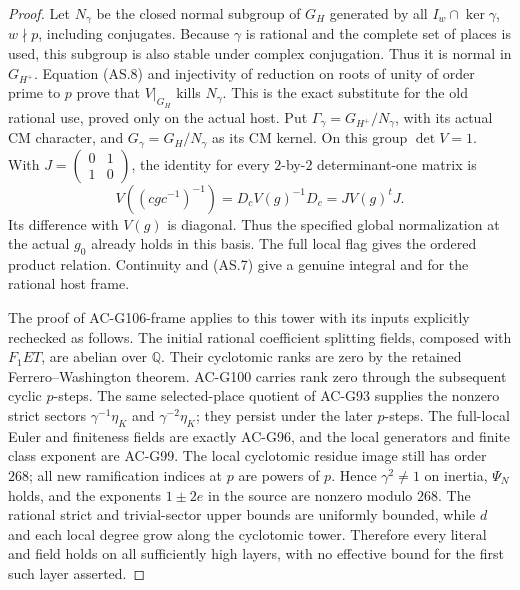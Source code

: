 \begin{proof}
Let \(N_\gamma\) be the closed normal subgroup of \(G_H\)
generated by all \(I_w\cap\ker\gamma\), \(w\nmid p\), including
conjugates.  Because \(\gamma\) is rational and the complete
set of places is used, this subgroup is also stable under
complex conjugation.  Thus it is normal in \(G_{H^+}\).
Equation (AS.8) and injectivity of reduction on roots of unity
of order prime to \(p\) prove that \(V|_{G_H}\) kills
\(N_\gamma\).  This is the exact substitute for the old
rational  use, proved only on the actual host.
Put \(\Gamma_\gamma=G_{H^+}/N_\gamma\), with its actual
CM character, and \(G_\gamma=G_H/N_\gamma\) as its CM kernel.
On this group \(\det V=1\).  With
\(J=\left(\begin{smallmatrix}0&1\\1&0\end{smallmatrix}\right)\),
the identity for every \(2\)-by-\(2\) determinant-one matrix is
\[
 V((cgc^{-1})^{-1})=D_cV(g)^{-1}D_c=J V(g)^tJ.
 \tag{AS.9}
\]
Its difference with \(V(g)\) is diagonal.  Thus the specified
global normalization at the actual \(g_0\) already holds in
this basis.  The full local flag gives the ordered product
relation.  Continuity and (AS.7) give a genuine integral
 and  for the rational host frame.

The proof of AC-G106-frame applies to this tower with its
inputs explicitly rechecked as follows.  The initial rational
coefficient splitting fields, composed with \(F_1ET\), are
abelian over \(\mathbb Q\).  Their cyclotomic ranks are zero
by the retained Ferrero--Washington theorem.  AC-G100 carries
rank zero through the subsequent cyclic \(p\)-steps.
The same selected-place quotient of AC-G93 supplies the
nonzero strict sectors \(\gamma^{-1}\eta_K\) and
\(\gamma^{-2}\eta_K\); they persist under the later \(p\)-steps.
The full-local Euler and finiteness fields are exactly AC-G96,
and the local generators and finite class exponent are AC-G99.
The local cyclotomic residue image still has order \(268\);
all new ramification indices at \(p\) are powers of \(p\).
Hence \(\gamma^2\ne1\) on inertia, \(\Psi_N\) holds, and
the exponents \(1\pm2e\) in the source  are nonzero
modulo \(268\).  The rational strict and trivial-sector upper
bounds are uniformly bounded, while \(d\) and each local
degree grow along the cyclotomic tower.  Therefore every
literal  and  field holds
on all sufficiently high layers, with no effective bound
for the first such layer asserted.


\end{proof}
